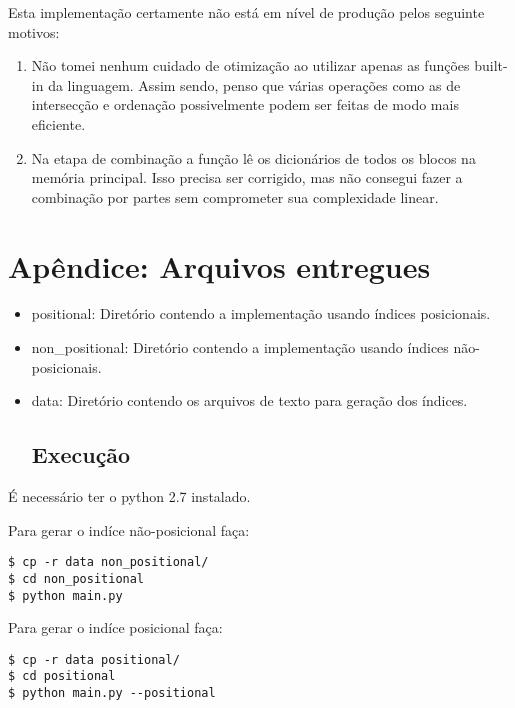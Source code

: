 \documentclass[a4paper]{article}
\begin{document}
Esta implementação certamente não está em nível de produção pelos seguinte motivos:

\begin{enumerate}
\item Não tomei nenhum cuidado de otimização ao utilizar apenas as funções built-in da linguagem.
Assim sendo, penso que várias operações como as de  intersecção e ordenação possivelmente podem ser feitas de modo mais eficiente.
\item Na etapa de combinação a função lê os dicionários de todos os blocos na memória principal. Isso precisa ser corrigido, mas não consegui fazer a combinação por partes sem comprometer sua complexidade linear.
\end{enumerate}

\section{Apêndice: Arquivos entregues}

\begin{itemize}
\item positional: Diretório contendo a implementação usando índices posicionais.
\item non_positional: Diretório  contendo a implementação usando índices não-posicionais.
\item data: Diretório contendo os arquivos de texto para geração dos índices.

\subsection{Execução}

\end{itemize}

É necessário ter o python 2.7 instalado. 

Para gerar o indíce não-posicional faça:

\begin{lstlisting}
$ cp -r data non_positional/
$ cd non_positional
$ python main.py
\end{lstlisting}

Para gerar o indíce posicional faça:

\begin{lstlisting}
$ cp -r data positional/
$ cd positional
$ python main.py --positional
\end{lstlisting}
\end{document}
